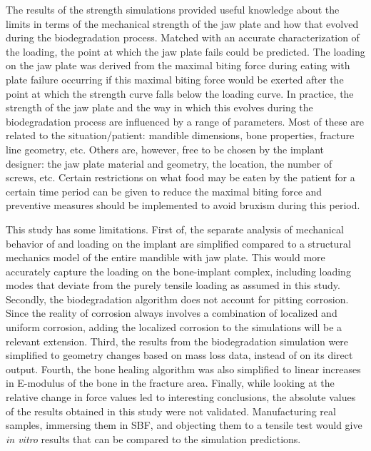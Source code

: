 The results of the strength simulations provided useful knowledge about the limits in terms of the mechanical strength of the jaw plate and how that evolved during the biodegradation process. Matched with an accurate characterization of the loading, the point at which the jaw plate fails could be predicted. The loading on the jaw plate was derived from the maximal biting force during eating with plate failure occurring if this maximal biting force would be exerted after the point at which the strength curve falls below the loading curve. In practice, the strength of the jaw plate and the way in which this evolves during the biodegradation process are influenced by a range of parameters. Most of these are related to the situation/patient: mandible dimensions, bone properties, fracture line geometry, etc. Others are, however, free to be chosen by the implant designer: the jaw plate material and geometry, the location, the number of screws, etc. Certain restrictions on what food may be eaten by the patient for a certain time period can be given to reduce the maximal biting force and preventive measures should be implemented to avoid bruxism during this period. 

This study has some limitations. First of, the separate analysis of mechanical behavior of and loading on the implant are simplified compared to a structural mechanics model of the entire mandible with jaw plate. This would more accurately capture the loading on the bone-implant complex, including loading modes that deviate from the purely tensile loading as assumed in this study. Secondly, the biodegradation algorithm does not account for pitting corrosion. Since the reality of corrosion always involves a combination of localized and uniform corrosion, adding the localized corrosion to the simulations will be a relevant extension. Third, the results from the biodegradation simulation were simplified to geometry changes based on mass loss data, instead of on its direct output. Fourth, the bone healing algorithm was also simplified to linear increases in E-modulus of the bone in the fracture area. Finally, while looking at the relative change in force values led to interesting conclusions, the absolute values of the results obtained in this study were not validated. Manufacturing real samples, immersing them in SBF, and objecting them to a tensile test would give \textit{in vitro} results that can be compared to the simulation predictions.

